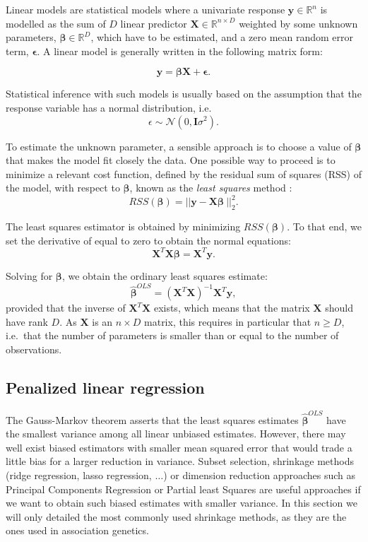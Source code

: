 \documentclass[]{book}
\begin{document}
Linear models are statistical models where a univariate response
\(\mathbf{y} \in \mathbb{R}^n\) is modelled as the sum of \(D\) linear predictor
\(\mathbf{X} \in \mathbb{R}^{n \times D}\) weighted by some unknown parameters,
\(\boldsymbol{\beta} \in \mathbb{R}^D\), which have to be estimated, and a zero mean random
error term, \(\boldsymbol{\epsilon}\). A linear model is generally written in the
following matrix form:

\[\mathbf{y} = \boldsymbol{\beta}\mathrm{\mathbf{X}} + \boldsymbol{\epsilon}.\]

Statistical inference with such models is usually based on the
assumption that the response variable has a normal distribution, i.e.
\[\epsilon \sim \mathcal{N}(0, \mathbf{I}\sigma^2).\]

To estimate the unknown parameter, a sensible approach is to choose a
value of \(\boldsymbol{\beta}\) that makes the model fit closely the data. One
possible way to proceed is to minimize a relevant cost function, defined
by the residual sum of squares (RSS) of the model, with respect to
\(\boldsymbol{\beta}\), known as the \emph{least squares} method \citep{gauss1809theoria}:
\[RSS(\boldsymbol{\beta}) = || \mathbf{y} - \mathbf{X} \boldsymbol{\beta}\ ||_2^2.
\label{eq:RSS}\]

The least squares estimator is obtained by minimizing \(RSS(\boldsymbol{\beta})\). To
that end, we set the derivative of equal to zero to obtain the normal
equations: \[\mathbf{X}^T\mathbf{X}\boldsymbol{\beta} = \mathbf{X}^T\mathbf{y}.
\label{eq:normaleq}\]

Solving for \(\boldsymbol{\beta}\), we obtain the ordinary least squares estimate:
\[\hat{\boldsymbol{\beta}}^{OLS} = (\mathbf{X}^T\mathbf{X})^{-1}\mathbf{X}^T\mathbf{y},\] provided that the
inverse of \(\mathbf{X}^T\mathbf{X}\) exists, which means that the matrix \(\mathbf{X}\) should
have rank \(D\). As \(\mathbf{X}\) is an \(n \times D\) matrix, this requires in
particular that \(n \geqslant D\), i.e.~that the number of parameters is
smaller than or equal to the number of observations.

\hypertarget{penalized}{%
\subsection{Penalized linear regression}\label{penalized}}

The Gauss-Markov theorem \citep{aitkin1935least} asserts that the least
squares estimates \(\hat{\boldsymbol{\beta}}^{OLS}\) have the smallest variance among
all linear unbiased estimates. However, there may well exist biased
estimators with smaller mean squared error that would trade a little
bias for a larger reduction in variance. Subset selection, shrinkage
methods (ridge regression, lasso regression, \(\dots\)) or dimension
reduction approaches such as Principal Components Regression or Partial
least Squares are useful approaches if we want to obtain such biased
estimates with smaller variance. In this section we will only detailed
the most commonly used shrinkage methods, as they are the ones used in
association genetics.
\end{document}
